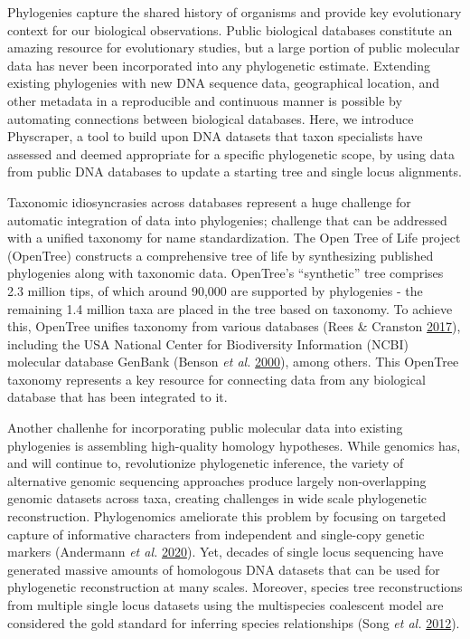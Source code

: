 \documentclass[]{article}
\begin{document}
Phylogenies capture the shared history of organisms and provide key evolutionary context for our biological observations.
Public biological databases constitute an amazing resource for evolutionary studies, but a large portion of public molecular data has never been incorporated into any phylogenetic estimate. Extending existing phylogenies with new DNA sequence data, geographical location, and other metadata in a reproducible and continuous manner is possible by automating connections between biological databases. Here, we introduce Physcraper, a tool to build upon DNA datasets that taxon specialists have assessed and deemed appropriate for a specific phylogenetic scope, by using data from public DNA databases to update a starting tree and single locus alignments.

Taxonomic idiosyncrasies across databases represent a huge challenge for automatic integration of data into phylogenies; challenge that can be addressed with a unified taxonomy for name standardization. The Open Tree of Life project (OpenTree)
constructs a comprehensive tree of life by synthesizing published phylogenies along with taxonomic data. OpenTree's ``synthetic'' tree comprises 2.3 million tips, of which around 90,000 are supported by phylogenies - the remaining 1.4 million taxa are placed in the tree based on taxonomy. To achieve this, OpenTree unifies taxonomy from various databases (Rees \& Cranston \protect\hyperlink{ref-rees2017automated}{2017}), including the USA National Center for Biodiversity Information (NCBI) molecular database GenBank (Benson \emph{et al.} \protect\hyperlink{ref-benson2000genbank}{2000}), among others. This OpenTree taxonomy represents a key resource for connecting data from any biological database that has been integrated to it.

Another challenhe for incorporating public molecular data into existing phylogenies is assembling high-quality homology hypotheses.
While genomics has, and will continue to, revolutionize phylogenetic inference, the variety of alternative genomic sequencing approaches produce largely non-overlapping genomic datasets across taxa, creating challenges in wide scale phylogenetic reconstruction.
Phylogenomics ameliorate this problem by focusing on targeted capture of informative characters from independent and single-copy genetic markers (Andermann \emph{et al.} \protect\hyperlink{ref-andermann2020guide}{2020}). Yet, decades of single locus sequencing have generated massive amounts of homologous DNA datasets that can be used for phylogenetic reconstruction at many scales. Moreover, species tree reconstructions from multiple single locus datasets using the multispecies coalescent model are considered the gold standard for inferring species relationships (Song \emph{et al.} \protect\hyperlink{ref-song2012resolving}{2012}).
\end{document}
